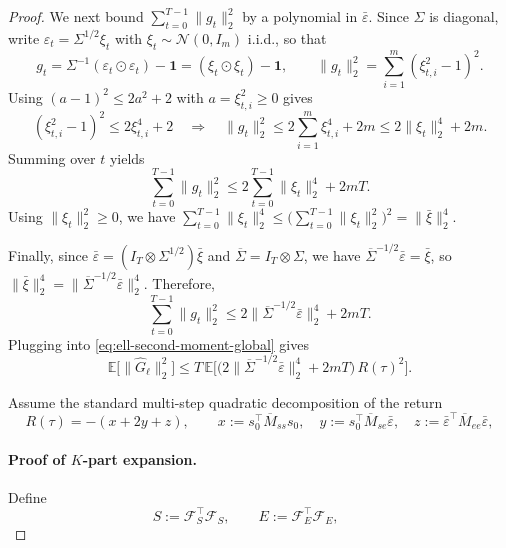\begin{proof}
We next bound $\sum_{t=0}^{T-1}\|g_t\|_2^2$ by a polynomial in $\bar\varepsilon$.
Since $\Sigma$ is diagonal, write $\varepsilon_t=\Sigma^{1/2}\xi_t$ with $\xi_t\sim\mathcal N(0,I_m)$ i.i.d.,
so that
\[
g_t=\Sigma^{-1}(\varepsilon_t\odot \varepsilon_t)-\mathbf 1
= (\xi_t\odot\xi_t)-\mathbf 1,
\qquad
\|g_t\|_2^2=\sum_{i=1}^m(\xi_{t,i}^2-1)^2.
\]
Using $(a-1)^2\le 2a^2+2$ with $a=\xi_{t,i}^2\ge 0$ gives
\[
(\xi_{t,i}^2-1)^2 \le 2\xi_{t,i}^4+2
\quad\Rightarrow\quad
\|g_t\|_2^2 \le 2\sum_{i=1}^m \xi_{t,i}^4 + 2m
\le 2\|\xi_t\|_2^4 + 2m.
\]
Summing over $t$ yields
\[
\sum_{t=0}^{T-1}\|g_t\|_2^2
\le 2\sum_{t=0}^{T-1}\|\xi_t\|_2^4 + 2mT.
\]
Using $\|\xi_t\|_2^2\ge 0$, we have 
$
\sum_{t=0}^{T-1}\|\xi_t\|_2^4
\le \Big(\sum_{t=0}^{T-1}\|\xi_t\|_2^2\Big)^2
=\|\bar\xi\|_2^4.
$

Finally, since $\bar\varepsilon=(I_T\otimes\Sigma^{1/2})\bar\xi$ and $\overline\Sigma=I_T\otimes\Sigma$,
we have $\overline\Sigma^{-1/2}\bar\varepsilon=\bar\xi$, so $\|\bar\xi\|_2^4=\|\overline\Sigma^{-1/2}\bar\varepsilon\|_2^4$.
Therefore,
\[
\sum_{t=0}^{T-1}\|g_t\|_2^2
\le 2\|\overline\Sigma^{-1/2}\bar\varepsilon\|_2^4 + 2mT.
\]
Plugging into \eqref{eq:ell-second-moment-global} gives
\[
\mathbb E\big[\|\widehat G_\ell\|_2^2\big]
\le
T\,\mathbb E\!\Big[\big(2\|\overline\Sigma^{-1/2}\bar\varepsilon\|_2^4 + 2mT\big)\,R(\tau)^2\Big].
\]


Assume the standard multi-step quadratic decomposition of the return
\[
R(\tau)=-(x+2y+z),
\qquad
x:=s_0^\top \overline M_{ss}s_0,\quad
y:=s_0^\top \overline M_{se}\bar\varepsilon,\quad
z:=\bar\varepsilon^\top \overline M_{ee}\bar\varepsilon,
\]
\paragraph{Proof of $K$-part expansion.}
Define
\[
S:=\mathcal F_S^\top\mathcal F_S,\qquad
E:=\mathcal F_E^\top\mathcal F_E,\qquad
\]



\end{proof}
